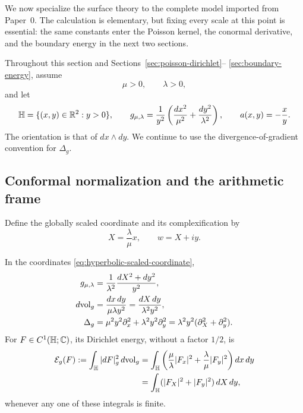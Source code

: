 We now specialize the surface theory to the complete model imported from
Paper~0.  The calculation is elementary, but fixing every scale at this point is
essential: the same constants enter the Poisson kernel, the conormal derivative,
and the boundary energy in the next two sections.

Throughout this section and Sections~\ref{sec:poisson-dirichlet}--
\ref{sec:boundary-energy}, assume
\[
 \mu>0,\qquad \lambda>0,
\]
and let
\[
 \mathbb{H}=\{(x,y)\in\mathbb{R}^2:y>0\},\qquad
 g_{\mu,\lambda}
 =\frac1{y^2}\left(\frac{dx^2}{\mu^2}
                    +\frac{dy^2}{\lambda^2}\right),
 \qquad
 a(x,y)=-\frac{x}{y}.
\]
The orientation is that of $dx\wedge dy$.  We continue to use the
divergence-of-gradient convention for $\Delta_g$.

\subsection{Conformal normalization and the arithmetic frame}

Define the globally scaled coordinate and its complexification by
\begin{equation}\label{eq:hyperbolic-scaled-coordinate}
 X=\frac{\lambda}{\mu}x,
 \qquad
 w=X+iy.
\end{equation}

\begin{proposition}
\label{prop:hyperbolic-analytic-normalization}
In the coordinates \eqref{eq:hyperbolic-scaled-coordinate},
\begin{align}
 g_{\mu,\lambda}
   &=\frac1{\lambda^2}\frac{dX^2+dy^2}{y^2},
   \label{eq:hyperbolic-conformal-metric}\\
 d\mathrm{vol}_g
   &=\frac{dx\,dy}{\mu\lambda y^2}
    =\frac{dX\,dy}{\lambda^2y^2},
   \label{eq:hyperbolic-volume}\\
 \Delta_g
   &=\mu^2y^2\partial_x^2+\lambda^2y^2\partial_y^2
    =\lambda^2y^2(\partial_X^2+\partial_y^2).
   \label{eq:hyperbolic-laplace-beltrami}
\end{align}
For $F\in C^1(\mathbb{H};\mathbb{C})$, its Dirichlet energy, without a factor $1/2$, is
\begin{equation}\label{eq:hyperbolic-dirichlet-energy}
\begin{aligned}
 \mathcal E_g(F)
 :=\int_{\mathbb{H}}|dF|_g^2\,d\mathrm{vol}_g
 &=\int_{\mathbb{H}}
   \left(\frac{\mu}{\lambda}|F_x|^2
        +\frac{\lambda}{\mu}|F_y|^2\right)dx\,dy
 \\
 &=\int_{\mathbb{H}}(|F_X|^2+|F_y|^2)\,dX\,dy,
\end{aligned}
\end{equation}
whenever any one of these integrals is finite.
\end{proposition}

